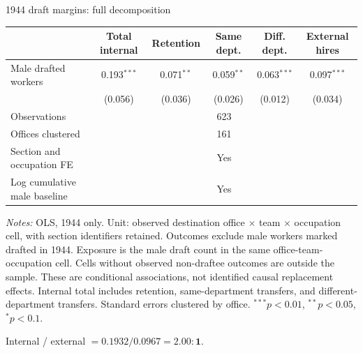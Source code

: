 \begin{frame}[t]{1944 draft margins: full decomposition}
\hypertarget{app:replacement-1944}{}
\tiny\centering
\begin{threeparttable}
\begin{tabular}{lccccc}
\toprule
 & Total internal & Retention & Same dept. & Diff. dept. & External hires \\
\midrule
Male drafted workers & 0.193$^{***}$ & 0.071$^{**}$ & 0.059$^{**}$ & 0.063$^{***}$ & 0.097$^{***}$ \\
 & (0.056) & (0.036) & (0.026) & (0.012) & (0.034) \\
\midrule
Observations & \multicolumn{5}{c}{623} \\
Offices clustered & \multicolumn{5}{c}{161} \\
Section and occupation FE & \multicolumn{5}{c}{Yes} \\
Log cumulative male baseline & \multicolumn{5}{c}{Yes} \\
\bottomrule
\end{tabular}
\begin{tablenotes}[flushleft]
\tiny\item \textit{Notes:} OLS, 1944 only. Unit: observed destination office $\times$ team $\times$ occupation cell, with section identifiers retained. Outcomes exclude male workers marked drafted in 1944. Exposure is the male draft count in the same office-team-occupation cell. Cells without observed non-draftee outcomes are outside the sample. These are conditional associations, not identified causal replacement effects. Internal total includes retention, same-department transfers, and different-department transfers. Standard errors clustered by office. $^{***}p<0.01$, $^{**}p<0.05$, $^{*}p<0.1$.
\end{tablenotes}
\end{threeparttable}
\vspace{2mm}
\par Internal / external $= 0.1932 / 0.0967 = \mathbf{2.00:1}$.
\end{frame}

